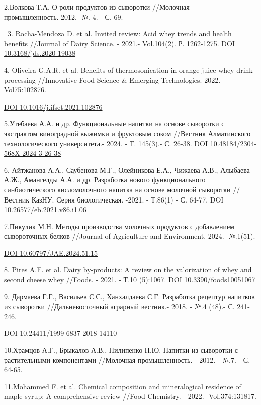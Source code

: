 {{2.Волкова Т.А. О роли продуктов из сыворотки //Молочная
промышленность.-2012. -№. 4. - С. 69.

~3. Rocha-Mendoza D. et al. Invited review: Acid whey trends and health
benefits //Journal of Dairy Science. - 2021.- Vol.104(2). Р. 1262-1275.
\href{https://doi.org/10.3168/jds.2020-19038}{DOI
10.3168/jds.2020-19038}

4. Oliveira G.A.R. et al. Benefits of thermosonication in orange juice
whey drink processing //Innovative Food Science \& Emerging
Technologies.-2022.- Vol75:102876.

\href{https://doi.org/10.1016/j.ifset.2021.102876}{DOI
10.1016/j.ifset.2021.102876}

5.Утебаева А.А. и др. Функциональные напитки на основе сыворотки с
экстрактом виноградной выжимки и фруктовым соком //Вестник Алматинского
технологического университета.- 2024. - Т. 145(3).- С. 26-38.
\href{https://doi.org/10.48184/2304-568X-2024-3-26-38}{DOI
10.48184/2304-568X-2024-3-26-38}

6. Айтжанова А.А., Саубенова М.Г., Олейникова Е.А., Чижаева А.В.,
Алыбаева А.Ж., Амангелды А.А. и др. Разработка нового функционального
синбиотического кисломолочного напитка на основе молочной сыворотки
//Вестник КазНУ. Серия биологическая. -2021. - Т.86(1) - С. 64-77. DOI
10.26577/eb.2021.v86.i1.06

7.Пикулик М.Н. Методы производства молочных продуктов с добавлением
сывороточных белков //Journal of Agriculture and Environment.-2024.-
№.1(51).

\href{https://doi.org/10.60797/JAE.2024.51.15}{DOI
10.60797/JAE.2024.51.15}

8. Pires A.F. et al. Dairy by-products: A review on the valorization of
whey and second cheese whey //Foods. - 2021. - Т.10 (5):1067.
\href{https://doi.org/10.3390/foods10051067}{DOI 10.3390/foods10051067}

9. Дармаева Г.Г., Васильев С.С., Ханхалдаева С.Г. Разработка рецептур
напитков из сыворотки //Дальневосточный аграрный вестник.- 2018. - №.4
(48).- С. 241-246.

DOI 10.24411/1999-6837-2018-14110

10.Храмцов А.Г., Брыкалов А.В., Пилипенко Н.Ю. Напитки из сыворотки с
растительными компонентами //Молочная промышленность. - 2012. - №.7. -
С. 64-65.

11.Mohammed F. et al. Chemical composition and mineralogical residence
of maple syrup: A comprehensive review //Food Chemistry. - 2022.-
Vol.374:131817.

}}
